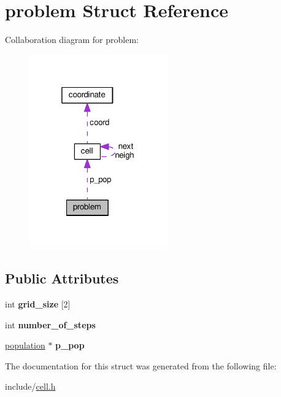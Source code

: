 \hypertarget{structproblem}{\section{problem Struct Reference}
\label{structproblem}
}


Collaboration diagram for problem\-:\nopagebreak
\begin{figure}[H]
\begin{center}
\leavevmode
\includegraphics[width=169pt]{structproblem__coll__graph}
\end{center}
\end{figure}
\subsection*{Public Attributes}
\begin{DoxyCompactItemize}
\item 
\hypertarget{structproblem_af1181ee7cfe4becf4d9474d254852c88}{int {\bfseries grid\-\_\-size} \mbox{[}2\mbox{]}}\label{structproblem_af1181ee7cfe4becf4d9474d254852c88}

\item 
\hypertarget{structproblem_a0f678c7f2aff7a1104141a3f5fe4f216}{int {\bfseries number\-\_\-of\-\_\-steps}}\label{structproblem_a0f678c7f2aff7a1104141a3f5fe4f216}

\item 
\hypertarget{structproblem_a840047e720ee20d193f686894c2de764}{\hyperlink{cell_8h_a9b7e2581d2e2f2fc3d141d599d3b11e3}{population} $\ast$ {\bfseries p\-\_\-pop}}\label{structproblem_a840047e720ee20d193f686894c2de764}

\end{DoxyCompactItemize}


The documentation for this struct was generated from the following file\-:\begin{DoxyCompactItemize}
\item 
include/\hyperlink{cell_8h}{cell.\-h}\end{DoxyCompactItemize}
